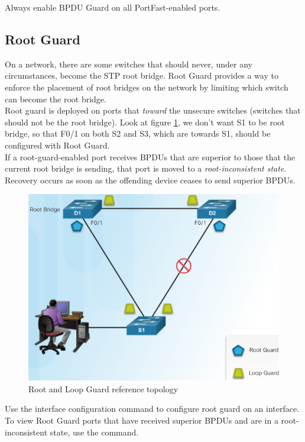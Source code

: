 \note Always enable BPDU Guard on all PortFast-enabled ports.

\subsection{Root Guard}

On a network, there are some switches that should never, under any circumstances, become the STP root bridge. Root Guard provides a way to enforce the placement of root bridges on the network by limiting which switch can become the root bridge. \\

Root guard is deployed on ports that \emph{toward} the unsecure switches (switches that should not be the root bridge). Look at figure \ref{RootLoopGuard}, we don't want S1 to be root bridge, so that F0/1 on both S2 and S3, which are towards S1, should be configured with Root Guard.\\
If a root-guard-enabled port receives BPDUs that are superior to those that the current root bridge is sending, that port is moved to a \emph{root-inconsistent state}. Recovery occurs as soon as the offending device ceases to send superior BPDUs.\\

\begin{figure}[hbtp]
\caption{Root and Loop Guard reference topology}\label{RootLoopGuard}
\centering
\includegraphics[scale=1]{pictures/RootLoopGuard.PNG}
\end{figure}


Use the  interface configuration command to configure root guard on an interface. To view Root Guard ports that have received superior BPDUs and are in a root-inconsistent state, use the  command.

